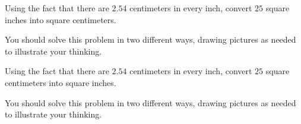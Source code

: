\documentclass[nooutcomes,noauthor, handout]{ximera}
\begin{document}
\begin{problem}
	Using the fact that there are $2.54$ centimeters in every inch, convert $25$ square inches into square centimeters. 
	
	You should solve this problem in two different ways, drawing pictures as needed to illustrate your thinking.
\end{problem}




\begin{problem}
	Using the fact that there are $2.54$ centimeters in every inch, convert $25$ square centimeters into square inches. 
	
	You should solve this problem in two different ways, drawing pictures as needed to illustrate your thinking.
\end{problem}











\newpage
\end{document}
